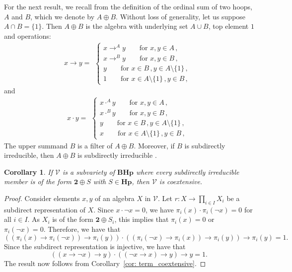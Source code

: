 \documentclass[11pt]{article}
\theoremstyle{pretty}
\newtheorem{corollary}[theorem]{Corollary}
\theoremstyle{plainnote}
\renewcommand{\2}{\mathbf{2}}
\newcommand{\V}{\mathcal{V}}
\newcommand{\Hoop}{\mathbf{Hp}}
\newcommand{\BoundedHoop}{\mathbf{BHp}}
\begin{document}
For the next result, we recall from \cite{BlokFerreirim2000StructureHoops} the definition of the ordinal sum of two hoops, $A$ and $B$, which we denote by $A \oplus B$. Without loss of generality, let us suppose $A\cap B =\{1\}$. Then $A\oplus B$ is the algebra with underlying set $A\cup B$, top element $1$ and operations:
\[
x\to y = \begin{aligned}
\begin{cases}
    x\to^A y\qquad\text{for }x,y\in A\,,\\
    x\to^B y\qquad\text{for }x,y\in B\,,\\
    y\qquad\text{for }x\in B\,,y\in A\setminus\{1\}\,,\\
    1\qquad \text{for }x\in A\setminus \{1\}\,,y\in B\,,
\end{cases}    
\end{aligned}
\]
and
\[
x\cdot y = \begin{aligned}
\begin{cases}
    x\cdot^A y\qquad\text{for }x,y\in A\,,\\
    x\cdot^B y\qquad\text{for }x,y\in B\,,\\
    y\qquad\text{for }x\in B\,,y\in A\setminus \{1\}\,,\\
    x\qquad \text{for }x\in A\setminus \{1\}\,,y\in B\,,
\end{cases}    
\end{aligned}
\]
The upper summand $B$ is a filter of $A\oplus B$. Moreover, if $B$ is subdirectly irreducible, then $A\oplus B$ is subdirectly irreducible \cite{BlokFerreirim2000StructureHoops}.



\begin{corollary}\label{cor: subdirectlyirreducible_coextensive}
If $\V$ is a subvariety of $\BoundedHoop$ where every subdirectly irreducible member is of the form $\2 \oplus S$ with $S \in \Hoop$, then $\V$ is coextensive.  
\end{corollary}
\begin{proof}
Consider elements $x, y$ of an algebra $X$ in $\V$. Let $r: X \to \prod_{i\in I}X_i$ be a subdirect representation of $X$. Since $x \cdot \neg x = 0$, we have $\pi_i(x)\cdot \pi_i(\neg x) = 0$ for all $i \in I$. As $X_i$ is of the form $\2 \oplus S_i$, this implies that $\pi_i(x) = 0$ or $\pi_i(\neg x) = 0$. Therefore, we have that \[((\pi_i(x) \to \pi_i(\neg x)) \to \pi_i(y))\cdot  ((\pi_i(\neg x) \to \pi_i(x)) \to \pi_i(y)) \to \pi_i(y) = 1.\] Since the subdirect representation is injective, we have that \[((x \to \neg x) \to y)\cdot ((\neg x \to x) \to y) \to y = 1.\] The result now follows from Corollary~\ref{cor: term_coextensive}.
\end{proof}
\end{document}
